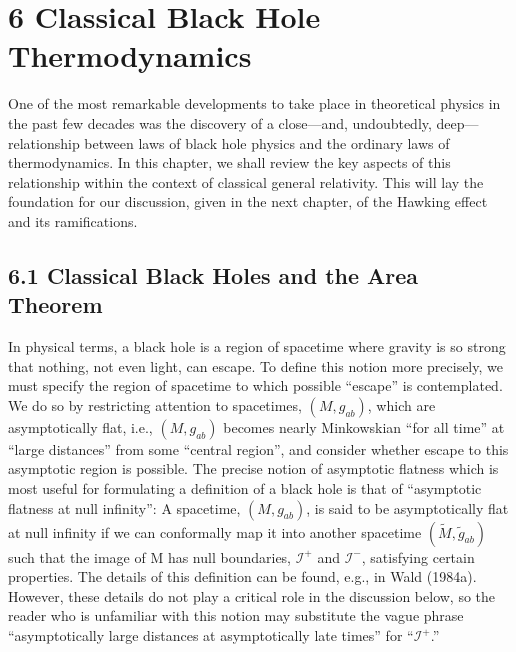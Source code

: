 \documentclass[11pt,a4paper]{article}
\begin{document}
\clearpage
\hypertarget{source-146}{}
\section*{6 Classical Black Hole Thermodynamics}\hypertarget{sec:6}{}

One of the most remarkable developments to take place in theoretical physics in the past few decades was the discovery of a close---and, undoubtedly, deep---relationship between laws of black hole physics and the ordinary laws of thermodynamics. In this chapter, we shall review the key aspects of this relationship within the context of classical general relativity. This will lay the foundation for our discussion, given in the next chapter, of the Hawking effect and its ramifications.

\subsection*{6.1 Classical Black Holes and the Area Theorem}\hypertarget{sec:6.1}{}

In physical terms, a black hole is a region of spacetime where gravity is so strong that nothing, not even light, can escape. To define this notion more precisely, we must specify the region of spacetime to which possible ``escape'' is contemplated. We do so by restricting attention to spacetimes, \((M,g_{ab})\), which are asymptotically flat, i.e., \((M,g_{ab})\) becomes nearly Minkowskian ``for all time'' at ``large distances'' from some ``central region'', and consider whether escape to this asymptotic region is possible. The precise notion of asymptotic flatness which is most useful for formulating a definition of a black hole is that of ``asymptotic flatness at null infinity'': A spacetime, \((M,g_{ab})\), is said to be asymptotically flat at null infinity if we can conformally map it into another spacetime \((\tilde{M}, \tilde{g}_{ab})\) such that the image of M has null boundaries, \(\mathscr I^+\) and \(\mathscr I^-\), satisfying certain properties. The details of this definition can be found, e.g., in Wald (1984a). However, these details do not play a critical role in the discussion below, so the reader who is unfamiliar with this notion may substitute the vague phrase ``asymptotically large distances at asymptotically late times'' for ``\(\mathscr I^+\).''
\end{document}
